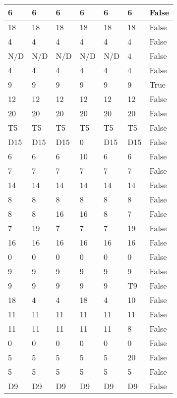\begin{longtable}[htbp]{| p{} | p{} | p{}| p{}| p{}| p{}| p{}|}
6 & 6 & 6 & 6 & 6 & 6 & False \\ \hline
18 & 18 & 18 & 18 & 18 & 18 & False \\ \hline
4 & 4 & 4 & 4 & 4 & 4 & False \\ \hline
\multicolumn{1}{|l|}{N/D} & \multicolumn{1}{l|}{N/D} & \multicolumn{1}{l|}{N/D} & \multicolumn{1}{l|}{N/D} & \multicolumn{1}{l|}{N/D} & 4 & False \\ \hline
4 & 4 & 4 & 4 & 4 & 4 & False \\ \hline
9 & 9 & 9 & 9 & 9 & 9 & True \\ \hline
12 & 12 & 12 & 12 & 12 & 12 & False \\ \hline
20 & 20 & 20 & 20 & 20 & 20 & False \\ \hline
\multicolumn{1}{|l|}{T5} & \multicolumn{1}{l|}{T5} & \multicolumn{1}{l|}{T5} & \multicolumn{1}{l|}{T5} & \multicolumn{1}{l|}{T5} & \multicolumn{1}{l|}{T5} & False \\ \hline
\multicolumn{1}{|l|}{D15} & \multicolumn{1}{l|}{D15} & \multicolumn{1}{l|}{D15} & 0 & \multicolumn{1}{l|}{D15} & \multicolumn{1}{l|}{D15} & False \\ \hline
6 & 6 & 6 & 10 & 6 & 6 & False \\ \hline
7 & 7 & 7 & 7 & 7 & 7 & False \\ \hline
14 & 14 & 14 & 14 & 14 & 14 & False \\ \hline
8 & 8 & 8 & 8 & 8 & 8 & False \\ \hline
8 & 8 & 16 & 16 & 8 & 7 & False \\ \hline
7 & 19 & 7 & 7 & 7 & 19 & False \\ \hline
16 & 16 & 16 & 16 & 16 & 16 & False \\ \hline
0 & 0 & 0 & 0 & 0 & 0 & False \\ \hline
9 & 9 & 9 & 9 & 9 & 9 & False \\ \hline
9 & 9 & 9 & 9 & 9 & \multicolumn{1}{l|}{T9} & False \\ \hline
18 & 4 & 4 & 18 & 4 & 10 & False \\ \hline
11 & 11 & 11 & 11 & 11 & 11 & False \\ \hline
11 & 11 & 11 & 11 & 11 & 8 & False \\ \hline
0 & 0 & 0 & 0 & 0 & 0 & False \\ \hline
5 & 5 & 5 & 5 & 5 & 20 & False \\ \hline
5 & 5 & 5 & 5 & 5 & 5 & False \\ \hline
\multicolumn{1}{|l|}{D9} & \multicolumn{1}{l|}{D9} & \multicolumn{1}{l|}{D9} & \multicolumn{1}{l|}{D9} & \multicolumn{1}{l|}{D9} & \multicolumn{1}{l|}{D9} & False \\ \hline

\end{longtable}
